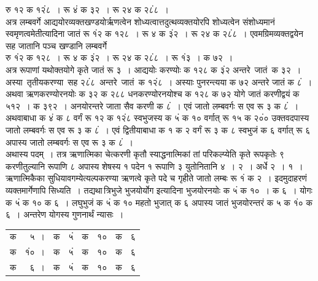 \documentclass[11pt, openany]{book}
\begin{document}
\vspace{-4mm}
\hspace{6mm} रु १२ क १२ं८~। रू ४ं क ३२~। रू २४ क २८ं८~। \\

\vspace{-4mm}
 अत्र लम्बवर्गे आद्ययोरव्यक्तखण्डयोर्ऋणत्वेन
शोध्यत्वात्तदुत्थव्यक्तयोरपि शोध्यत्वेन संशोध्यमानं स्वमृणत्वमेतीत्यादिना जातं रू १ं२  क १२८~। रू ४ क ३ं२~। रू २४ क २८ं८~। एवमग्रिमव्यक्तद्वयेन सह जातानि पञ्च खण्डानि लम्बवर्गे\\

\vspace{-4mm}
\hspace{6mm} रु १ं२ क १२८~। रू ४ क ३ं२~। रू २४ क २८ं८~। रू १ं३~। क ७२~।\\

\vspace{-4mm}
 अत्र रूपाणां यथोक्तयोगे कृते जातं रू ३~। आद्ययोः करण्योः क १२८ 
क ३ं२ अन्तरे \,जातं \,क ३२~। अस्या \,तृतीयकरण्या \,सह २८ं८ \,अन्तरे \,जातं \,क १२ं८~। अस्याः पुनरन्त्यया क ७२ अन्तरे जातं क ८ं~। अथवा ऋणकरण्योरनयोः क ३२ क २८८ धनकरण्योरनयोश्च क १२८ क ७२ योगे 
जातं करणीद्वयं क ५१२~। क ३९२~। अनयोरन्तरे जाता सैव करणी क ८ं~। 
एवं जातो लम्बवर्गः स एव रू ३ क ८ं~। अथवाबाधा क ४ं क ८ वर्गं रू
१२ क १२ं८ स्वभुजस्य क ५ं क १० वर्गात् रू १५ क २०ं० उक्तवदपास्य
जातो लम्बवर्गः स एव रू ३ क ८ं~। एवं द्वितीयाबाधा क १ क २ वर्गं रू 
३ क ८ स्वभुजं क ६ वर्गात् रू ६ अपास्य जातो लम्बवर्गः स एव रू ३ क
८ं~। \\

\vspace{-4mm}
 अथास्य पदम्~। तत्र ऋणात्मिका चेत्करणी कृतौ स्याद्धनात्मिकां तां परिकल्प्येति कृते रूपकृतेः ९ करणीतुल्यानि रूपाणि ८ अपास्य शेषस्य १ पदेन १
रूपाणि 
३ युतोनितानि ४~। २~। अर्धे २~। १~। ऋणात्मिकैका सुधियावगम्येत्यल्पकरण्या ऋणत्वे कृते पदे च गृहीते जातो लम्बः रू १ं क २~। इदमुदाहरणं 
व्यक्तमार्गेणापि सिध्यति~। तद्यथा\textendash \,त्रिभुजे भुजयोर्योग इत्यादिना
भुजयोरनयोः क ५ं क १०~। क ६~। योगः क ५ं क १० क ६~। लघुभुजं क ५ं क १० महतो भुजात् क ६ अपास्य जातं भुजयोरन्तरं क ५ क १ं० क ६~। अन्तरेण योगस्य गुणनार्थं न्यासः~। 
\begin{table}[h!]
    \centering\s
    \begin{tabular}{lrlrlrlr}
     क &५~। &क &५ं&क &१० &क &६ \\
 क &१ं०~।& क &५ं& क& १०& क& ६\\
 क &६~। &क &५ं &क &१० &क& ६
    \end{tabular}
\end{table}
\end{document}
